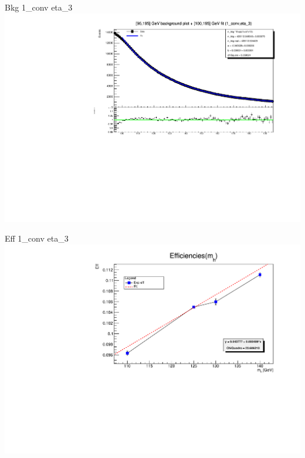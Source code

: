 \documentclass[10pt,UKenglish, leqno, xcolor = dvipsnames]{beamer}
\begin{document}
		\begin{frame}{Bkg 1\_conv eta\_3}
			\vfill
			\centering
			\includegraphics[width=1.\textwidth]{../images/week_10/bkg_100_195GeV_fit_1_conv_eta_3.pdf}
			\vfill
		\end{frame}
	
		\begin{frame}{Eff 1\_conv eta\_3}
			\vfill
			\includegraphics[width=1.\textwidth]{../images/week_10/efficiencies_fit_1_conv_eta_3.pdf}
			\vfill
		\end{frame}
	
\end{document}
